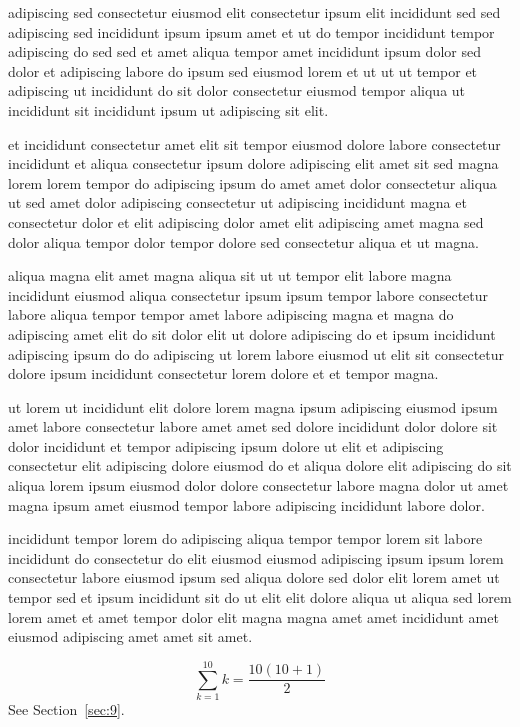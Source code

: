 \documentclass{article}
\begin{document}
adipiscing sed consectetur eiusmod elit consectetur ipsum elit incididunt sed sed adipiscing sed incididunt ipsum ipsum amet et ut do tempor incididunt tempor adipiscing do sed sed et amet aliqua tempor amet incididunt ipsum dolor sed dolor et adipiscing labore do ipsum sed eiusmod lorem et ut ut ut tempor et adipiscing ut incididunt do sit dolor consectetur eiusmod tempor aliqua ut incididunt sit incididunt ipsum ut adipiscing sit elit.

et incididunt consectetur amet elit sit tempor eiusmod dolore labore consectetur incididunt et aliqua consectetur ipsum dolore adipiscing elit amet sit sed magna lorem lorem tempor do adipiscing ipsum do amet amet dolor consectetur aliqua ut sed amet dolor adipiscing consectetur ut adipiscing incididunt magna et consectetur dolor et elit adipiscing dolor amet elit adipiscing amet magna sed dolor aliqua tempor dolor tempor dolore sed consectetur aliqua et ut magna.

aliqua magna elit amet magna aliqua sit ut ut tempor elit labore magna incididunt eiusmod aliqua consectetur ipsum ipsum tempor labore consectetur labore aliqua tempor tempor amet labore adipiscing magna et magna do adipiscing amet elit do sit dolor elit ut dolore adipiscing do et ipsum incididunt adipiscing ipsum do do adipiscing ut lorem labore eiusmod ut elit sit consectetur dolore ipsum incididunt consectetur lorem dolore et et tempor magna.

ut lorem ut incididunt elit dolore lorem magna ipsum adipiscing eiusmod ipsum amet labore consectetur labore amet amet sed dolore incididunt dolor dolore sit dolor incididunt et tempor adipiscing ipsum dolore ut elit et adipiscing consectetur elit adipiscing dolore eiusmod do et aliqua dolore elit adipiscing do sit aliqua lorem ipsum eiusmod dolor dolore consectetur labore magna dolor ut amet magna ipsum amet eiusmod tempor labore adipiscing incididunt labore dolor.

incididunt tempor lorem do adipiscing aliqua tempor tempor lorem sit labore incididunt do consectetur do elit eiusmod eiusmod adipiscing ipsum ipsum lorem consectetur labore eiusmod ipsum sed aliqua dolore sed dolor elit lorem amet ut tempor sed et ipsum incididunt sit do ut elit elit dolore aliqua ut aliqua sed lorem lorem amet et amet tempor dolor elit magna magna amet amet incididunt amet eiusmod adipiscing amet amet sit amet.

\begin{equation} \sum_{k=1}^{10} k = \frac{10(10+1)}{2} \end{equation}
See Section~\ref{sec:9}.
\end{document}
